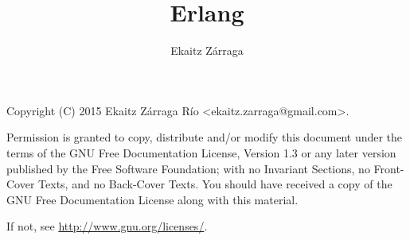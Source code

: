 \documentclass[a4paper,10pt]{article}
\title{Erlang}
\author{Ekaitz Zárraga}
\begin{document}
\maketitle

\begin{abstract}
\end{abstract}

\newpage
Copyright (C)  2015  Ekaitz Zárraga Río \textless ekaitz.zarraga@gmail.com\textgreater.

Permission is granted to copy, distribute and/or modify this document under the terms of the GNU Free
Documentation License, Version 1.3 or any later version published by the Free Software Foundation; with
no Invariant Sections, no Front-Cover Texts, and no Back-Cover Texts. You should have received a copy of
the GNU Free Documentation License along with this material.

If not, see \url{http://www.gnu.org/licenses/}.
\newpage

\newpage
  \tableofcontents
\newpage
{}





\end{document}
